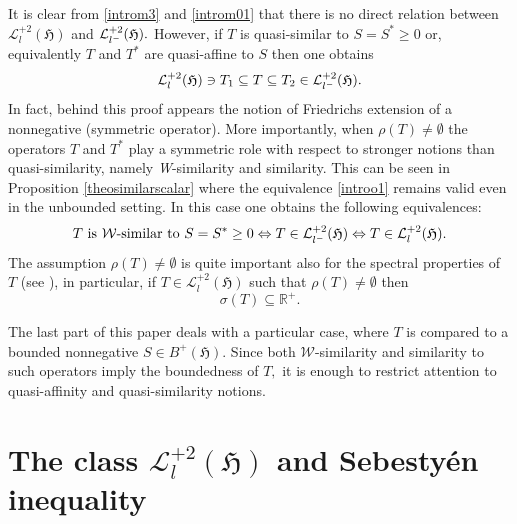 \documentclass{amsart}
\newcommand{\ifaf}{\Leftrightarrow}
\newcommand{\vide}{\emptyset}
\newcommand{\h}{\mathfrak{H}}
\newcommand{\adj}{^*}
\newcommand{\tstar}{T^{*}}
\newcommand{\rplus}{\mathbb{R^+}}
\newcommand{\inclu}{\subseteq}
\newcommand{\lplus}{B^{+}(\h)}
\newcommand{\ldeux}{\mathcal{L}_l^{+2}(\h)}
\newcommand{\lldeux}{\mathcal{L}_{{l}^{\tiny-}}^{+2}(\h)}
\numberwithin{equation}{section}
\begin{document}
  \hspace*{0.4cm} It is clear from    \eqref{introm3} and \eqref{introm01} that there is no direct relation between $\ldeux$ and $\lldeux.$ However, if $T$ is quasi-similar to $S=S\adj \geq 0$ or, equivalently $T$ and $\tstar$ are quasi-affine to $S$ then one obtains
  $$
\ldeux \ni  T_1  \inclu T \inclu T_2 \in \lldeux.
  $$
 In fact, behind this proof appears the notion of Friedrichs extension of a nonnegative (symmetric operator).
More importantly, when $\rho(T) \neq \vide$ the operators $T$ and $\tstar$ play a symmetric role  with respect to   stronger notions than quasi-similarity, namely   \emph{W}-similarity  and similarity. This can be seen in  Proposition \ref{theosimilarscalar} where the equivalence \eqref{introo1} remains valid even in the unbounded setting. In this case one  obtains the following equivalences:
 $$
T \text{ is $\mathcal{W}$-similar to }  S=S\adj \geq 0 \ifaf T\in \lldeux  \ifaf T\in \ldeux.
  $$
     The assumption $\rho(T) \neq \vide$ is  quite important also for the spectral properties of $T$ (see \cite{paper3}), in particular, if $T \in \ldeux$ such that $\rho(T) \neq \vide$ then
 $$
 \sigma(T ) \inclu \rplus.
 $$


The last part of this paper deals with a particular case, where $T$ is compared to a bounded nonnegative $S \in \lplus.$  Since  both  $\mathcal{W}$-similarity and similarity to such operators imply the boundedness of $T,$ it is enough to restrict attention to quasi-affinity and quasi-similarity notions.








                           \section{The class $\ldeux$ and Sebestyén inequality} \label{section2}

\end{document}
